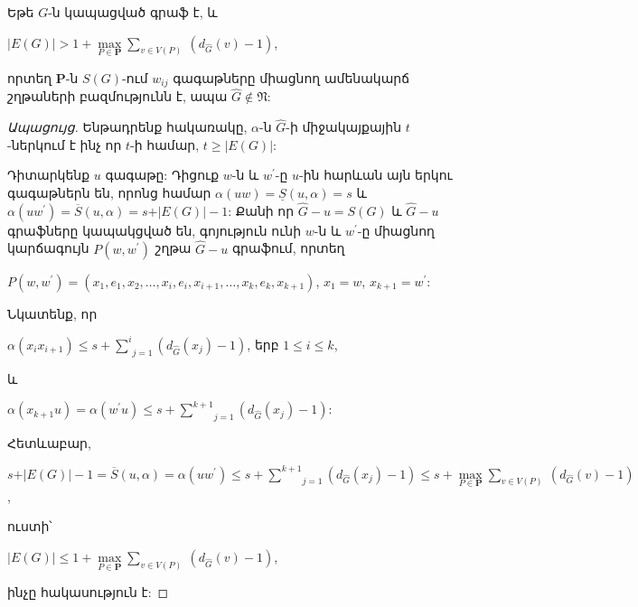 \begin{theorem}
\label{t3_subdivision_paths} Եթե $G$-ն կապացված գրաֆ է, և
\begin{center}
$\vert E(G)\vert
> 1+ {\max\limits_{P\in \mathbf{P}}}{\sum\limits_{v\in
V(P)}}\ \left(d_{\widehat{G}}(v)-1\right)$,
\end{center}
որտեղ $\mathbf{P}$-ն $S(G)$-ում $w_{ij}$ գագաթները միացնող ամենակարճ շղթաների բազմությունն է, ապա $\widehat{G}\notin \mathfrak{N}$:
\end{theorem}
\begin{proof}[Ապացույց]
Ենթադրենք հակառակը, $\alpha$-ն $\widehat{G}$-ի միջակայքային 
$t$-ներկում է ինչ որ $t$-ի համար, $t\geq \vert E(G)\vert$:

Դիտարկենք $u$ գագաթը: Դիցուք $w$-ն և $w^{\prime}$-ը $u$-ին հարևան այն երկու գագաթներն են, որոնց համար $\alpha(uw)=\underline{S}(u,\alpha)=s$ և
$\alpha(uw^{\prime})=\overline{S}(u,\alpha)=s+\vert E(G)\vert-1$: Քանի որ $\widehat{G}-u=S(G)$ և $\widehat{G}-u$ գրաֆները կապակցված են, գոյություն ունի $w$-ն և $w^{\prime}$-ը միացնող կարճագույն $P(w,w^{\prime})$ շղթա $\widehat{G}-u$ գրաֆում, որտեղ
\begin{center}
$P(w,w^{\prime})=(x_{1},e_{1},x_{2},\ldots,x_{i},e_{i},x_{i+1},\ldots,x_{k},e_{k},x_{k+1})$,
$x_{1}=w$, $x_{k+1}=w^{\prime}$:
\end{center}

Նկատենք, որ
\begin{center}
$\alpha(x_{i}x_{i+1})\leq s+\underset{j=1}{\overset{i}{\sum
}}(d_{\widehat{G}}(x_{j})-1)$, երբ $1\leq i\leq k$,
\end{center}
և
\begin{center}
$\alpha(x_{k+1}u)=\alpha(w^{\prime}u)\leq
s+\underset{j=1}{\overset{k+1}{\sum }}(d_{\widehat{G}}(x_{j})-1)$:
\end{center}

Հետևաբար,
\begin{center}
$s+\vert E(G)\vert -1=\overline{S}(u,\alpha)=\alpha(uw^{\prime})\leq
s+\underset{j=1}{\overset{k+1}{\sum }}(d_{\widehat{G}}(x_{j})-1)\leq
s+{\max\limits_{P\in \mathbf{P}}}{\sum\limits_{v\in V(P)}}\
\left(d_{\widehat{G}}(v)-1\right)$,
\end{center}
ուստի՝
\begin{center}
$\vert E(G)\vert \leq 1+{\max\limits_{P\in
\mathbf{P}}}{\sum\limits_{v\in V(P)}}\
\left(d_{\widehat{G}}(v)-1\right)$,
\end{center}
ինչը հակասություն է:
\end{proof}

